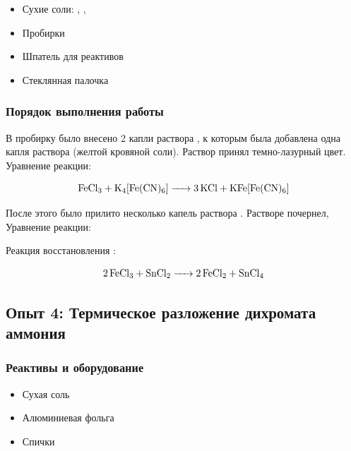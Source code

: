 \documentclass[a4paper, 12pt]{article}
\begin{document}
\begin{itemize}
	\item Сухие соли: , , 
	
	\item Пробирки
	\item Шпатель для реактивов
	\item Стеклянная палочка
\end{itemize}

\subsubsection{Порядок выполнения работы}

В пробирку было внесено 2 капли раствора , к которым была добавлена одна капля раствора  (желтой кровяной соли). Раствор принял темно-лазурный цвет. Уравнение реакции:

\begin{equation}
	\ce{FeCl3 + K4[Fe(CN)6] -> 3KCl + KFe[Fe(CN)6]}
\end{equation}

После этого было прилито несколько капель раствора . Растворе почернел,  Уравнение реакции:

Реакция восстановления :

\begin{equation}
	\ce{2 FeCl3 + SnCl2 -> 2FeCl2 + SnCl4}
\end{equation}


\subsection{Опыт 4: Термическое разложение дихромата аммония}

\subsubsection{Реактивы и оборудование}

\begin{itemize}
	\item Сухая соль 
	
	\item Алюминиевая фольга
	
	\item Спички
\end{itemize}	
\end{document}
